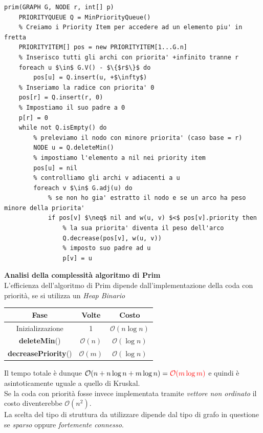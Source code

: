 \documentclass[../cheatSheetAlgoritmi.tex]{subfiles}
\begin{document}
\begin{lstlisting}[caption=Albero di Copertura di Peso Minimo - Kruskal]
prim(GRAPH G, NODE r, int[] p)
	PRIORITYQUEUE Q = MinPriorityQueue()
	% Creiamo i Priority Item per accedere ad un elemento piu' in fretta
	PRIORITYITEM[] pos = new PRIORITYITEM[1...G.n]
	% Inserisco tutti gli archi con priorita' +infinito tranne r
	foreach u $\in$ G.V() - $\{$r$\}$ do
		pos[u] = Q.insert(u, +$\infty$)
	% Inseriamo la radice con priorita' 0
	pos[r] = Q.insert(r, 0)
	% Impostiamo il suo padre a 0
	p[r] = 0
	while not Q.isEmpty() do
		% preleviamo il nodo con minore priorita' (caso base = r)
		NODE u = Q.deleteMin()
		% impostiamo l'elemento a nil nei priority item
		pos[u] = nil
		% controlliamo gli archi v adiacenti a u
		foreach v $\in$ G.adj(u) do
			% se non ho gia' estratto il nodo e se un arco ha peso minore della priorita' 
			if pos[v] $\neq$ nil and w(u, v) $<$ pos[v].priority then
				% la sua priorita' diventa il peso dell'arco
				Q.decrease(pos[v], w(u, v))
				% imposto suo padre ad u
				p[v] = u
\end{lstlisting}
\textbf{Analisi della complessità algoritmo di Prim}\\
L'efficienza dell'algoritmo di Prim dipende dall'implementazione della coda con priorità, se si utilizza un \emph{Heap Binario}
\begin{center}
	\renewcommand{\arraystretch}{1.2}
	\begin{tabular}{ |c|c|c| } 
		\hline
			\textbf{Fase} & \textbf{Volte} & \textbf{Costo}\\ 
		\hline
			Inizializzazione & 1 &  $\mathcal{O}(n \log n)$\\ 
		\hline
			\textbf{deleteMin}() & $\mathcal{O}(n)$ &  $\mathcal{O}(\log n)$ \\
		\hline
			\textbf{decreasePriority}() & $\mathcal{O}(m)$ & $\mathcal{O}(\log n)$\\
		\hline
	\end{tabular}
\end{center}
Il tempo totale è dunque $\mathcal{O}(n + n \log n + m \log n) = \textcolor{red}{\mathcal{O}(m \log m)}$ e quindi è asintoticamente uguale a quello di Kruskal.\\
Se la coda con priorità fosse invece implementata tramite \emph{vettore non ordinato} il costo diventerebbe $\mathcal{O}(n^{2})$.\\
La scelta del tipo di struttura da utilizzare dipende dal tipo di grafo in questione se \emph{sparso} oppure \emph{fortemente connesso}.\\\\
\end{document}
